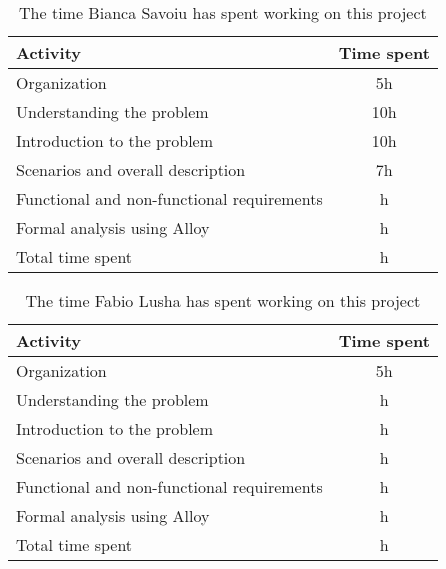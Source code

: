 \label{sec:Effort spent}%
\begin{table}[h!]
    \centering
    \begin{tabular}{|l|c|}
     \hline
     \textbf{Activity} & \textbf{Time spent} \\
    \hline
    Organization & 5h \\
    \hline
    Understanding the problem & 10h \\
    \hline
    Introduction to the problem & 10h \\
    \hline
    Scenarios and overall description & 7h \\
    \hline
    Functional and non-functional requirements & h \\
    \hline
    Formal analysis using Alloy & h \\
    \hline
    Total time spent & h \\
    \hline
\end{tabular}
    \caption{The time Bianca Savoiu has spent working on this project}
    \label{tab:Assumptions}
\end{table}


\begin{table}[h!]
    \centering
    \begin{tabular}{|l|c|}
    \hline
     \textbf{Activity} & \textbf{Time spent} \\
    \hline
    Organization & 5h \\
    \hline
    Understanding the problem & h \\
    \hline
    Introduction to the problem & h \\
    \hline
    Scenarios and overall description & h \\
    \hline
    Functional and non-functional requirements & h \\
    \hline
    Formal analysis using Alloy & h \\
    \hline
    Total time spent & h \\
    \hline
\end{tabular}
    \caption{The time Fabio Lusha has spent working on this project}
    \label{tab:Assumptions}
\end{table}